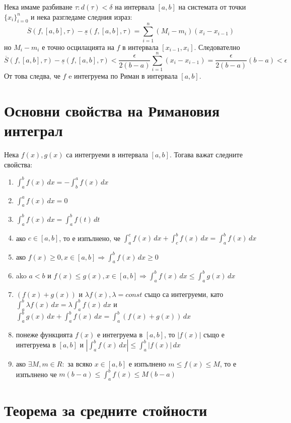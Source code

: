 \documentclass[fleqn,12pt]{article}
\begin{document}
Нека имаме разбиване $\tau: d(\tau)<\delta$ на интервала $[a,b]$ на системата от точки $\{x_i\}_{i=0}^{n}$ и нека разгледаме следния израз:
\[ \overline{S}(f,[a,b],\tau) - \underline{s}(f,[a,b],\tau) = \sum_{i=1}^{n} (M_i - m_i)(x_i - x_{i-1}) \]
но $M_i - m_i$ е точно осцилацията на $f$ в интервала $[x_{i-1},x_i]$. Следователно 
\[ \overline{S}(f,[a,b],\tau) - \underline{s}(f,[a,b],\tau) < \frac{\epsilon}{2(b-a)}\sum_{i=1}^{n} (x_i - x_{i-1}) = \frac{\epsilon}{2(b-a)}(b-a)< \epsilon \]
От това следва, че $f$ e интегруема по Риман в интервала $[a,b]$.

\section{Основни свойства на Римановия интеграл}
Нека $f(x),g(x)$ са интегруеми в интервала $[a,b]$. Тогава важат следните свойства:
\begin{enumerate}
    \item $\int_{a}^{b}  f(x)\,dx = -\int_{b}^{a} f(x)\,dx$
    \item $\int_{a}^{a}  f(x)\,dx = 0$
    \item $\int_{a}^{b}  f(x)\,dx = \int_{a}^{b}  f(t)\,dt$
    \item ако $c\in[a,b]$, то е изпълнено, че $\int_{a}^{c} f(x)\,dx + \int_{c}^{b} f(x)\,dx = \int_{a}^{b} f(x)\,dx$
    \item ако $f(x)\geq 0, x \in [a,b] \Rightarrow \int_{a}^{b}  f(x)\,dx \geq 0$
    \item ako $a < b$ и $f(x) \leq g(x), x \in [a,b] \Rightarrow \int_{a}^{b}  f(x)\,dx \leq \int_{a}^{b}  g(x)\,dx$
    \item $(f(x) + g(x))$ и $\lambda f(x), \lambda = const$ също са интегруеми, като $\int_{a}^{b} \lambda f(x)\,dx = \lambda \int_{a}^{b} f(x)\,dx$ и $\int_{a}^{b} g(x)\,dx + \int_{a}^{b} f(x)\,dx = \int_{a}^{b} (f(x)+g(x))\,dx$
    \item понеже функцията $f(x)$ е интегруема в $[a,b]$, то $|f(x)|$ също е интегруема в $[a,b]$ и $|\int_{a}^{b} f(x)\,dx| \leq \int_{a}^{b}  |f(x)|\,dx$
    \item ако $\exists M,m \in R:$ за всяко $x \in [a,b]$ е изпълнено $m \leq f(x) \leq M$, то е изпълнено че $m(b-a) \leq \int_{a}^{b} f(x) \leq M(b-a)$
\end{enumerate}

\section{Теорема за средните стойности}
\end{document}
